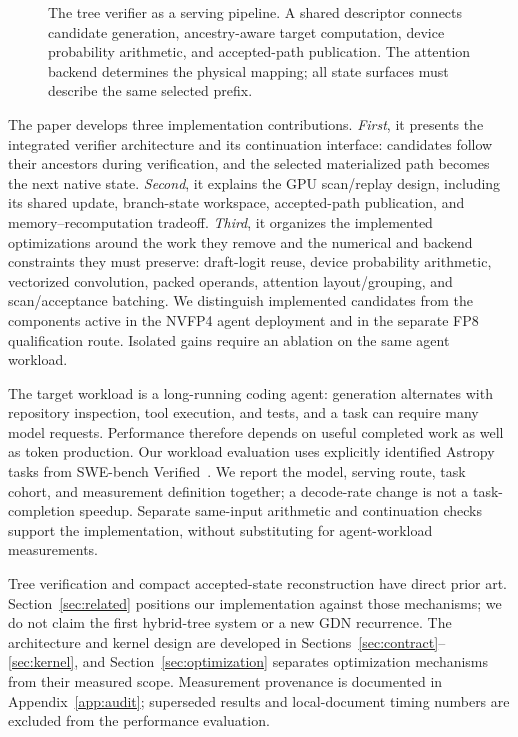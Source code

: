 \documentclass[conference]{IEEEtran}
\begin{document}
\begin{figure}[t]
\centering

\caption{The tree verifier as a serving pipeline. A shared descriptor connects candidate generation, ancestry-aware target computation, device probability arithmetic, and accepted-path publication. The attention backend determines the physical mapping; all state surfaces must describe the same selected prefix.}
\label{fig:pipeline}
\end{figure}

The paper develops three implementation contributions. \textit{First}, it presents the integrated verifier architecture and its continuation interface: candidates follow their ancestors during verification, and the selected materialized path becomes the next native state. \textit{Second}, it explains the GPU scan/replay design, including its shared update, branch-state workspace, accepted-path publication, and memory--recomputation tradeoff. \textit{Third}, it organizes the implemented optimizations around the work they remove and the numerical and backend constraints they must preserve: draft-logit reuse, device probability arithmetic, vectorized convolution, packed operands, attention layout/grouping, and scan/acceptance batching. We distinguish implemented candidates from the components active in the NVFP4 agent deployment and in the separate FP8 qualification route. Isolated gains require an ablation on the same agent workload.

The target workload is a long-running coding agent: generation alternates with repository inspection, tool execution, and tests, and a task can require many model requests. Performance therefore depends on useful completed work as well as token production. Our workload evaluation uses explicitly identified Astropy tasks from SWE-bench Verified~\cite{jimenez2024swe}. We report the model, serving route, task cohort, and measurement definition together; a decode-rate change is not a task-completion speedup. Separate same-input arithmetic and continuation checks support the implementation, without substituting for agent-workload measurements.

Tree verification and compact accepted-state reconstruction have direct prior art. Section~\ref{sec:related} positions our implementation against those mechanisms; we do not claim the first hybrid-tree system or a new GDN recurrence. The architecture and kernel design are developed in Sections~\ref{sec:contract}--\ref{sec:kernel}, and Section~\ref{sec:optimization} separates optimization mechanisms from their measured scope. Measurement provenance is documented in Appendix~\ref{app:audit}; superseded results and local-document timing numbers are excluded from the performance evaluation.
\end{document}

